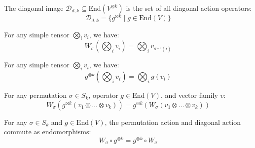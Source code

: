 \begin{definition}\label{def:diagImage}
  \leanok
  The diagonal image $\mathcal{D}_{d,k} \subseteq \text{End}(V^{\otimes k})$ is the set of all diagonal action operators:
  \begin{equation}
    \mathcal{D}_{d,k} = \{ g^{\otimes k} \mid g \in \text{End}(V) \}
  \end{equation}
\end{definition}

\begin{lemma}\label{lem:permAction_tprod}
  \leanok
  For any simple tensor $\bigotimes_{i} v_i$, we have:
  \begin{equation}
    W_\sigma(\bigotimes_{i} v_i) = \bigotimes_{i} v_{\sigma^{-1}(i)}
  \end{equation}
\end{lemma}

\begin{lemma}\label{lem:diagAction_tprod}
  \leanok
  For any simple tensor $\bigotimes_{i} v_i$, we have:
  \begin{equation}
    g^{\otimes k}(\bigotimes_{i} v_i) = \bigotimes_{i} g(v_i)
  \end{equation}
\end{lemma}

\begin{lemma}\label{lem:permAction_diagAction_tprod}
  \leanok
  For any permutation $\sigma \in S_k$, operator $g \in \text{End}(V)$, and vector family $v$:
  \begin{equation}
    W_\sigma(g^{\otimes k}(v_1 \otimes \dots \otimes v_k)) = g^{\otimes k}(W_\sigma(v_1 \otimes \dots \otimes v_k))
  \end{equation}
\end{lemma}

\begin{theorem}\label{thm:permAction_diagAction_comm}
  \leanok
  For any $\sigma \in S_k$ and $g \in \text{End}(V)$, the permutation action and diagonal action commute as endomorphisms:
  \begin{equation}
    W_\sigma \circ g^{\otimes k} = g^{\otimes k} \circ W_\sigma
  \end{equation}
\end{theorem}

